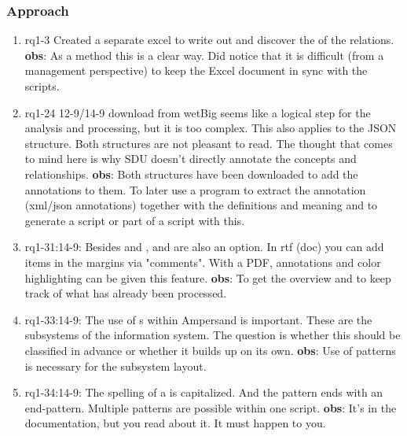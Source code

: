 \subsubsection{Approach}
\begin{comment}
plaats hier de afgehandelde items.
\end{comment}
\begin{enumerate}
    \item rq1-3 Created a separate excel to write out and discover the  of the relations.
    \newline\textbf{obs}: As a method this is a clear way.
    Did notice that it is difficult (from a management perspective) to keep the Excel document in sync with the scripts.

    \item rq1-24 12-9/14-9  download from wetBig seems like a logical step for the analysis and processing, but it is too complex.
    This also applies to the JSON structure.
    Both structures are not pleasant to read.
    The thought that comes to mind here is why SDU doesn't directly annotate the concepts and relationships.
    \newline\textbf{obs}: Both structures have been downloaded to add the annotations to them.
    To later use a program to extract the annotation (xml/json annotations) together with the definitions and meaning and to generate a script or part of a script with this.
    
    \item rq1-31:14-9: Besides  and ,  and  are also an option.
    In rtf (doc) you can add items in the margins via "comments".
    With a PDF, annotations and color highlighting can be given this feature.
    \newline\textbf{obs}: To get the overview and to keep track of what has already been processed.
    
    \item rq1-33:14-9: The use of s within Ampersand is important.
    These are the subsystems of the information system.
    The question is whether this should be classified in advance or whether it builds up on its own.
    \newline\textbf{obs}: Use of patterns is necessary for the subsystem layout.
    
    \item rq1-34:14-9: The spelling of a  is capitalized.
    And the pattern ends with an end-pattern.
    Multiple patterns are possible within one script.
    \newline\textbf{obs}: It's in the documentation, but you read about it.
    It must happen to you.
    

\end{enumerate}
